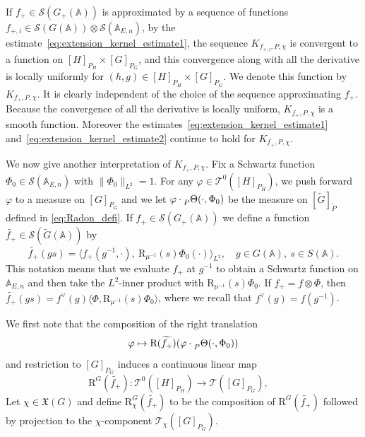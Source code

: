 \documentclass[letterpaper,11pt]{amsart}
\newcommand{\fX}{\mathfrak{X}}
\newcommand{\bA}{\mathbb{A}}
\newcommand{\cS}{\mathcal{S}}
\newcommand{\cT}{\mathcal{T}}
\newcommand{\<}{\negthickspace}
\providecommand{\aabs}[1]{\lVert#1\rVert}
\theoremstyle{definition}
\theoremstyle{plain}
\theoremstyle{remark}
\numberwithin{equation}{section}
\begin{document}
If $f_+ \in \cS(G_+(\bA))$ is approximated by a sequence of functions $f_{+, i}
\in \cS(G(\bA)) \otimes \cS(\bA_{E, n})$, by the
estimate~\eqref{eq:extension_kernel_estimate1}, the sequence $K_{f_{+, i}, P,
\chi}$ is convergent to a function on $[H]_{P_H} \times [G]_{P_G}$, and this
convergence along with all the derivative is locally uniformly for $(h, g) \in [H]_{P_H} \times [G]_{P_G}$.
We denote this function by $K_{f_+,P, \chi}$. It is clearly independent of
the choice of the sequence approximating $f_+$. Because the convergence of all the derivative is
locally uniform, $K_{f_+, P, \chi}$ is a smooth function. Moreover the
estimates~\eqref{eq:extension_kernel_estimate1}
and~\eqref{eq:extension_kernel_estimate2} continue to hold for $K_{f_+, P,
\chi}$.




We now give another interpretation of $K_{f_+, P, \chi}$. Fix a Schwartz
function $\Phi_0 \in \cS(\bA_{E, n})$ with $\aabs{\Phi_0}_{L^2} = 1$. For any
$\varphi \in \cT^0([H]_{P_H})$, we push forward $\varphi$ to
a measure on $[G]_{P_G}$ and we let $\varphi \cdot
\prescript{}{P}{\Theta}(\cdot, \Phi_0)$ be the measure on
$[\widetilde{G}]_{\widetilde{P}}$ defined in \eqref{eq:Radon_defi}. If $f_+ \in
\cS(G_+(\bA))$ we define a function $\widetilde{f_+} \in
\cS(\widetilde{G}(\bA))$ by
    \[
    \widetilde{f_+}(gs) =
    \langle f_+(g^{-1}, \cdot),\  \mathrm{R}_{\mu^{-1}}(s) \Phi_0(\cdot) \rangle_{L^2}, \quad
    g \in G(\bA), \ s \in S(\bA).
    \]
This notation means that we evaluate $f_+$ at $g^{-1}$ to obtain a Schwartz function
on $\bA_{E, n}$ and then take the $L^2$-inner product with
$\mathrm{R}_{\mu^{-1}}(s)\Phi_0$.
If $f_+ = f \otimes \Phi$, then $\widetilde{f_+}(gs) = f^\vee(g) \langle
\Phi, \mathrm{R}_{\mu^{-1}}(s) \Phi_0 \rangle$, where we recall that $f^\vee(g) = f(g^{-1})$.

We first note that the composition of the right translation
    \[
    \varphi \mapsto
    \mathrm{R}(\widetilde{f_+})(\varphi \cdot
    \prescript{}{P}{\Theta(\cdot, \Phi_0)})
    \]
and restriction to $[G]_{P_G}$ induces a continuous linear map
    \begin{equation}    \label{eq:interpretation_of_the_kernel}
    \mathrm{R}^G(\widetilde{f_+}):
    \cT^0([H]_{P_H}) \to \cT([G]_{P_G}), \quad
    \end{equation}
Let $\chi \in \fX(G)$ and define $\mathrm{R}_{\chi}^G(\widetilde{f_+})$ to be the
composition of $\mathrm{R}^G(\widetilde{f_+})$ followed by projection to the
$\chi$-component $\cT_{\chi}([G]_{P_G})$.
\end{document}
